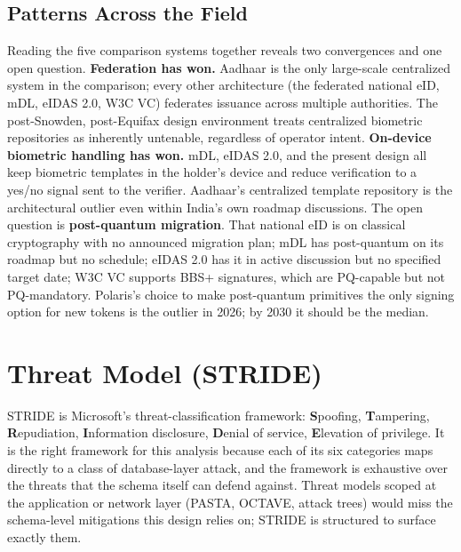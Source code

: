 \documentclass[11pt,letterpaper]{article}
\begin{document}
\subsection*{Patterns Across the Field}

Reading the five comparison systems together reveals two convergences and one open question. \textbf{Federation has won.} Aadhaar is the only large-scale centralized system in the comparison; every other architecture (the federated national eID, mDL, eIDAS 2.0, W3C VC) federates issuance across multiple authorities. The post-Snowden, post-Equifax design environment treats centralized biometric repositories as inherently untenable, regardless of operator intent. \textbf{On-device biometric handling has won.} mDL, eIDAS 2.0, and the present design all keep biometric templates in the holder's device and reduce verification to a yes/no signal sent to the verifier. Aadhaar's centralized template repository is the architectural outlier even within India's own roadmap discussions. The open question is \textbf{post-quantum migration}. That national eID is on classical cryptography with no announced migration plan; mDL has post-quantum on its roadmap but no schedule; eIDAS 2.0 has it in active discussion but no specified target date; W3C VC supports BBS+ signatures, which are PQ-capable but not PQ-mandatory. Polaris's choice to make post-quantum primitives the only signing option for new tokens is the outlier in 2026; by 2030 it should be the median.

\section{Threat Model (STRIDE)}
\label{app:threat-model}

STRIDE is Microsoft's threat-classification framework: \textbf{S}poofing, \textbf{T}ampering, \textbf{R}epudiation, \textbf{I}nformation disclosure, \textbf{D}enial of service, \textbf{E}levation of privilege. It is the right framework for this analysis because each of its six categories maps directly to a class of database-layer attack, and the framework is exhaustive over the threats that the schema itself can defend against. Threat models scoped at the application or network layer (PASTA, OCTAVE, attack trees) would miss the schema-level mitigations this design relies on; STRIDE is structured to surface exactly them.
\end{document}
